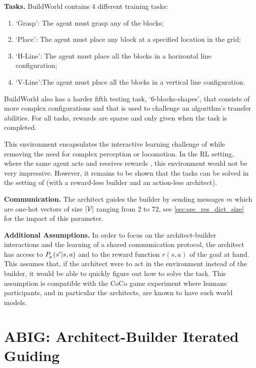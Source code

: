 \noindent\textbf{Tasks. } BuildWorld contains 4 different training tasks: 
\begin{enumerate}[noitemsep,topsep=0pt]
	\item `Grasp': The agent must grasp any of the blocks;
	\item `Place': The agent must place any block at a specified location in the grid;
	\item `H-Line': The agent must place all the blocks in a horizontal line configuration;
	\item `V-Line':The agent must place all the blocks in a vertical line configuration.
\end{enumerate}
BuildWorld also has a harder fifth testing task, `6-blocks-shapes', that consists of more complex configurations and that is used to challenge an algorithm's transfer abilities. For all tasks, rewards are sparse and only given when the task is completed. 

This environment encapsulates the interactive learning challenge of \abp while removing the need for complex perception or locomotion. 
In the RL setting, where the same agent acts and receives rewards%
, this environment would not be very impressive. However, it remains to be shown that the tasks can be solved in the %
setting of \abp (with a reward-less builder and an action-less architect).

\noindent\textbf{Communication. } The architect guides the builder by sending messages $m$ which are one-hot vectors of size $|{\mathcal{V}}|$ ranging from 2 to 72, see \ref{sec:sec_res_dict_size} for the impact of this parameter.

\noindent\textbf{Additional Assumptions. }  In order to focus on the architect-builder interactions and the learning of a shared communication protocol, the architect has access to $P_{\!_E}(s'|s,a)$ and to the reward function $r(s,a)$ of the goal at hand. This assumes that, if the architect were to act in the environment instead of the builder, it would be able to quickly figure out how to solve the task. This assumption is compatible with the CoCo game experiment \citep{vollmer2014studying} where humans participants, and in particular the architects, are known to have such world models.


\section{ABIG: Architect-Builder Iterated Guiding}
